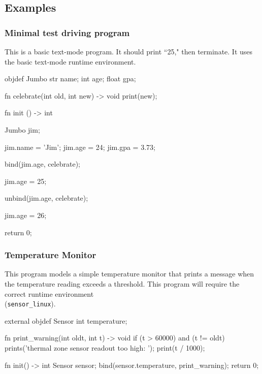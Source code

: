 \subsection{Examples}
\subsubsection{Minimal test driving program}
This is a basic text-mode program. It should print ``25," then terminate.
It uses the basic text-mode runtime environment.

\vspace{-0.5cm}
\begin{mylisting}
objdef Jumbo
{
  str name;
  int age;
  float gpa;
}

fn celebrate(int old, int new) -> void
{
  print(new);
}

fn init () -> int
{
  Jumbo jim;

  jim.name = 'Jim';
  jim.age  = 24;
  jim.gpa  = 3.73;

  bind(jim.age, celebrate);

  jim.age = 25;

  unbind(jim.age, celebrate);

  jim.age = 26;

  return 0;
}
\end{mylisting}

\subsubsection{Temperature Monitor}
This program models a simple temperature monitor that prints a message when the temperature
reading exceeds a threshold. This program will require the correct runtime environment\\
(\verb|sensor_linux|).

\vspace{-0.5cm}
\begin{mylisting}
external objdef Sensor
{
  int temperature;
}

fn print_warning(int oldt, int t) -> void
{
  if (t > 60000) and (t != oldt)
  {
    prints('thermal zone sensor readout too high: ');
    print(t / 1000);
  }
}

fn init() -> int
{
  Sensor sensor;
  bind(sensor.temperature, print_warning);
  return 0;
}
\end{mylisting}
